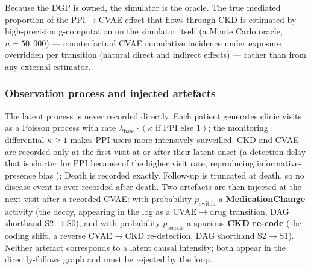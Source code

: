 \documentclass[sn-vancouver-num]{sn-jnl}
\begin{document}
Because the DGP is owned, the simulator is the oracle. The true mediated proportion of the PPI$\rightarrow$CVAE effect that flows through CKD is estimated by high-precision g-computation on the simulator itself (a Monte Carlo oracle, $n = 50{,}000$) --- counterfactual CVAE cumulative incidence under exposure overridden per transition (natural direct and indirect effects) --- rather than from any external estimator.

\subsubsection{Observation process and injected artefacts}
The latent process is never recorded directly. Each patient generates clinic visits as a Poisson process with rate $\lambda_{\text{base}} \cdot (\kappa \text{ if PPI else } 1)$; the monitoring differential $\kappa \ge 1$ makes PPI users more intensively surveilled. CKD and CVAE are recorded only at the first visit at or after their latent onset (a detection delay that is shorter for PPI because of the higher visit rate, reproducing informative-presence bias \citep{casey2016}); Death is recorded exactly. Follow-up is truncated at death, so no disease event is ever recorded after death. Two artefacts are then injected at the next visit after a recorded CVAE: with probability $p_{\text{switch}}$ a \textbf{MedicationChange} activity (the decoy, appearing in the log as a CVAE$\rightarrow$drug transition, DAG shorthand S2$\rightarrow$S0), and with probability $p_{\text{recode}}$ a spurious \textbf{CKD re-code} (the coding shift, a reverse CVAE$\rightarrow$CKD re-detection, DAG shorthand S2$\rightarrow$S1). Neither artefact corresponds to a latent causal intensity; both appear in the directly-follows graph and must be rejected by the loop.
\end{document}
